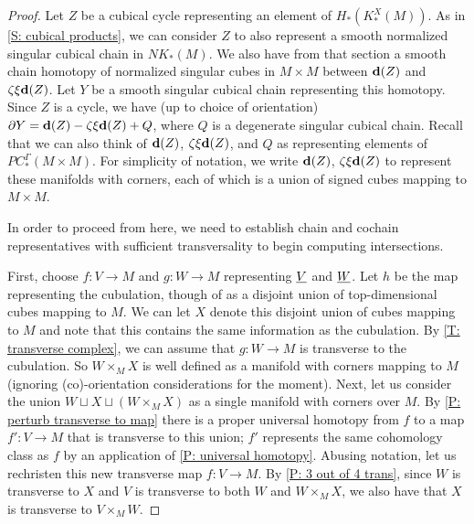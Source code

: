 \documentclass{amsart}
\begin{document}
\begin{proof}
Let $Z$ be a cubical cycle representing an element of $H_*(K_*^X(M))$. As in \cref{S: cubical products}, we can consider $Z$ to also represent a smooth normalized singular cubical chain in $NK_*(M)$. We also have from that section a smooth chain homotopy of normalized singular cubes  in $M\times M$ between $\mathbf{d}(Z)$ and $\zeta\xi\mathbf{d}(Z)$. Let $Y$ be a smooth singular cubical chain representing this homotopy. Since $Z$ is a cycle, we have (up to choice of orientation) $\partial Y=\mathbf{d}(Z)-\zeta\xi\mathbf{d}(Z)+Q$, where $Q$ is a degenerate singular cubical chain. Recall that we can also think of $\mathbf{d}(Z)$, $\zeta\xi\mathbf{d}(Z)$, and $Q$ as representing elements of $PC^\Gamma_*(M\times M)$. For simplicity of notation, we write $\mathbf{d}(Z)$, $\zeta\xi\mathbf{d}(Z)$ to represent these manifolds with corners, each of which is a union of signed cubes mapping to $M\times M$. 

In order to proceed from here, we need to establish chain and cochain representatives with sufficient transversality to begin computing intersections. 

First, choose $f:V\to M$ and $g:W\to M$ representing $\underline{V}$ and $\underline{W}$. Let $h$ be the map representing the cubulation, though of as a disjoint union of top-dimensional cubes mapping to $M$. We can let $X$ denote this disjoint union of cubes mapping to $M$ and note that this contains the same information as the cubulation. By \cref{T: transverse complex}, we can assume that $g:W\to M$ is transverse to the cubulation. So $W\times_MX$ is well defined as a manifold with corners mapping to $M$ (ignoring (co)-orientation considerations for the moment). 
Next, let us consider the union $W\sqcup X\sqcup (W\times_M X)$ as a single manifold with corners over $M$. By \cref{P: perturb transverse to map} there is a proper universal homotopy from $f$ to a map $f':V\to M$ that is transverse to this union; $f'$ represents the same cohomology class as $f$ by an application of \cref{P: universal homotopy}. Abusing notation, let us rechristen this new transverse map $f:V\to M$.  By \cref{P: 3 out of 4 trans}, since $W$ is transverse to $X$ and $V$ is transverse to both $W$ and $W\times_MX$, we also have that $X$ is transverse to $V\times_M W$. 


\end{proof}
\end{document}
